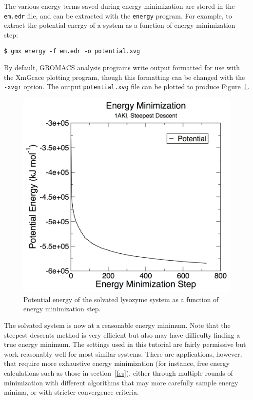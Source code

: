 \documentclass[9pt,tutorial]{livecoms}
\begin{document}
The various energy terms saved during energy minimization are stored in the \texttt{em.edr} file, and can be extracted with the \texttt{energy} program. For example, to extract the potential energy of a system as a function of energy minimization step:

\begin{verbatim}
$ gmx energy -f em.edr -o potential.xvg
\end{verbatim}

By default, GROMACS analysis programs write output formatted for use with the XmGrace plotting program, though this formatting can be changed with the \texttt{-xvgr} option. The output \texttt{potential.xvg} file can be plotted to produce Figure~\ref{lyso_em_fig}.

\begin{figure}[h]
\centering
\includegraphics{plot_lyso_em_potential}
\caption{Potential energy of the solvated lysozyme system as a function of energy minimization step.}
\label{lyso_em_fig}
\end{figure}

The solvated system is now at a reasonable energy minimum. Note that the steepest descents method is very efficient but also may have difficulty finding a true energy minimum. The settings used in this tutorial are fairly permissive but work reasonably well for most similar systems. There are applications, however, that require more exhaustive energy minimization (for instance, free energy calculations such as those in section~\ref{fes}), either through multiple rounds of minimization with different algorithms that may more carefully sample energy minima, or with stricter convergence criteria.
\end{document}
